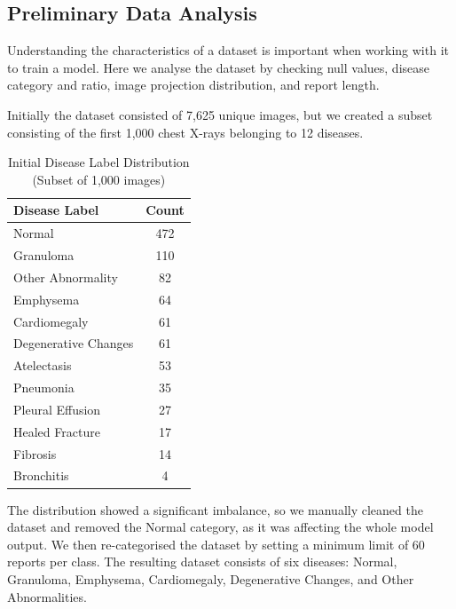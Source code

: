 \subsection{Preliminary Data Analysis}

Understanding the characteristics of a dataset is important when working with it to train a
model. Here we analyse the dataset by checking null values, disease category and ratio, image
projection distribution, and report length.

Initially the dataset consisted of 7,625 unique images, but we created a subset consisting of
the first 1,000 chest X-rays belonging to 12 diseases.

\vspace{1em}
\begin{table}[H]
    \centering
    \caption{Initial Disease Label Distribution (Subset of 1,000 images)}
    \label{tab:disease-dist}
    \begin{tabular}{lc}
        \toprule
        \textbf{Disease Label} & \textbf{Count} \\
        \midrule
        Normal              & 472 \\
        Granuloma           & 110 \\
        Other Abnormality   & 82  \\
        Emphysema           & 64  \\
        Cardiomegaly        & 61  \\
        Degenerative Changes& 61  \\
        Atelectasis         & 53  \\
        Pneumonia           & 35  \\
        Pleural Effusion    & 27  \\
        Healed Fracture     & 17  \\
        Fibrosis            & 14  \\
        Bronchitis          & 4   \\
        \bottomrule
    \end{tabular}
\end{table}

The distribution showed a significant imbalance, so we manually cleaned the dataset and
removed the Normal category, as it was affecting the whole model output. We then
re-categorised the dataset by setting a minimum limit of 60 reports per class. The resulting
dataset consists of six diseases: Normal, Granuloma, Emphysema, Cardiomegaly,
Degenerative Changes, and Other Abnormalities.

